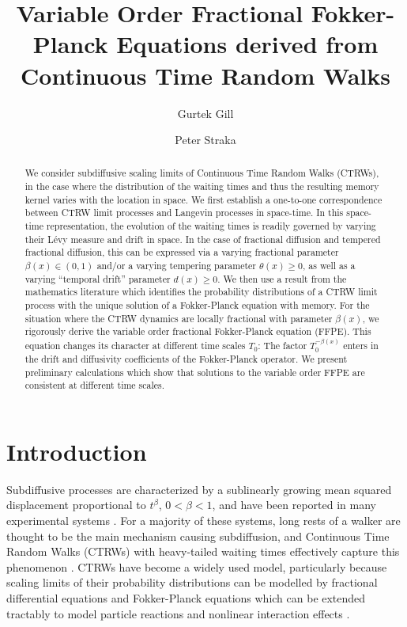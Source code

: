 \documentclass[a4paper,12pt]{article}
\title{Variable Order Fractional Fokker-Planck Equations derived from 
Continuous Time Random Walks}
\author{Gurtek Gill \and Peter Straka}
\numberwithin{equation}{section}
\theoremstyle{plain}
\theoremstyle{definition}
\theoremstyle{remark}
\numberwithin{equation}{section}
\newcommand{\1}{\mathbf 1}
\begin{document}
\maketitle

\begin{abstract}
We consider subdiffusive scaling limits of Continuous Time Random Walks (CTRWs),
in the case where the distribution of the waiting times and thus
the resulting memory kernel varies with the location in space.  We first 
establish a 
one-to-one correspondence between CTRW limit processes and Langevin processes in 
space-time.  In this space-time representation, the evolution of the waiting 
times is readily governed by varying their L\'evy measure and drift in space. 
In the case of fractional diffusion and tempered fractional diffusion, this 
can be expressed via a varying fractional parameter $\beta(x) \in (0,1)$ and/or 
a varying tempering parameter $\theta(x) \ge 0$, as well as a varying 
``temporal drift'' parameter $d(x) \ge 0$. 
We then use a result from the mathematics literature which identifies the 
probability distributions of a CTRW limit process with the unique solution 
of a Fokker-Planck equation with memory.  For the situation where the CTRW 
dynamics are locally fractional with parameter $\beta(x)$, we rigorously derive 
the variable order fractional Fokker-Planck equation (FFPE).  This equation 
changes its character at different time scales $T_0$: The factor $T_0^{-\beta(x)}$ 
enters in the drift and diffusivity coefficients of the Fokker-Planck operator.  
We present preliminary calculations which show that solutions to the variable 
order FFPE are consistent at different time scales. 
\end{abstract}


\section{Introduction}

Subdiffusive processes are characterized by a sublinearly growing mean squared
displacement proportional to $t^\beta$, $0 < \beta < 1$, and have been reported
in many experimental systems
\cite{Metzler2000,TMT04,Santamaria2006a,Banks2005,Regner2013}.
For a majority of these systems, long rests of a walker are thought to be the
main mechanism causing subdiffusion, and Continuous Time Random Walks (CTRWs)
with heavy-tailed waiting times effectively capture this phenomenon
\cite{Scher1975,BG1990,Metzler2000}.  CTRWs have become a widely used model,
particularly because scaling limits of their probability distributions can be
modelled by fractional differential equations and Fokker-Planck equations
\cite{BMK00,Baeumer2001,HLS10PRL,Hahn11} which can be extended tractably to
model particle reactions \cite{Langlands2008d,Angstmann2013} and nonlinear
interaction effects \cite{StrakaFedotov14}.
\end{document}
